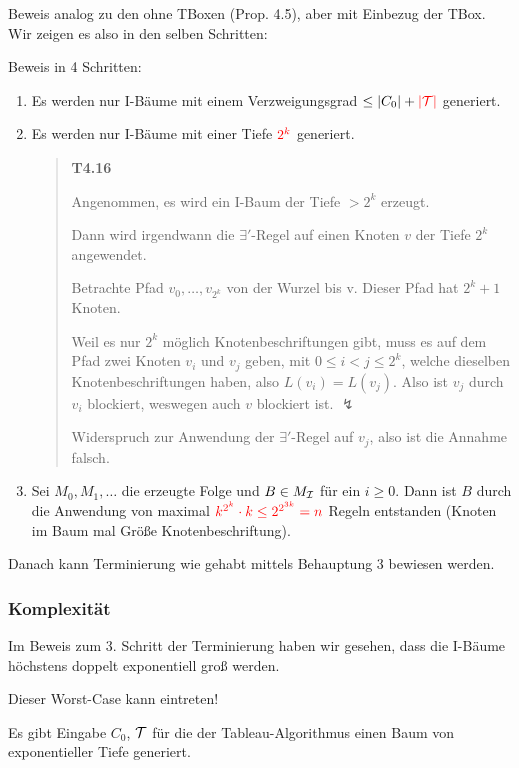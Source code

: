 Beweis analog zu den ohne TBoxen (Prop. 4.5), aber mit Einbezug der TBox. Wir zeigen es also in den selben Schritten:

Beweis in 4 Schritten:

\begin{enumerate}
\def\labelenumi{\arabic{enumi}.}
\item
  Es werden nur I-Bäume mit einem Verzweigungsgrad $\leq \left| C_{0} \right| + \color{red} \left| \MT \right|$ generiert.
\item
  Es werden nur I-Bäume mit einer Tiefe $\color{red} 2^k$ generiert.
  \begin{quote}
  \textbf{T4.16}

  Angenommen, es wird ein I-Baum der Tiefe $> 2^k$ erzeugt.

  Dann wird irgendwann die $\exists '$-Regel auf einen Knoten $v$ der Tiefe $2^k$ angewendet.

  Betrachte Pfad $v_0, \ldots , v_{2^k}$ von der Wurzel bis v. Dieser Pfad hat $2^k+1$ Knoten.

  Weil es nur $2^k$ möglich Knotenbeschriftungen gibt, muss es auf dem Pfad zwei Knoten $v_i$ und $v_j$ geben, mit $0 \leq i < j \leq 2^k$, welche dieselben Knotenbeschriftungen haben, also $L(v_i) = L(v_j)$. Also ist $v_j$ durch $v_i$ blockiert, weswegen auch $v$ blockiert ist. $\lightning$

  Widerspruch zur Anwendung der $\exists '$-Regel auf $v_j$, also ist die Annahme falsch.
  \end{quote}
\item
  Sei $M_{0},M_1,\ldots$ die erzeugte Folge und $B \in M_{\mathcal{I}}$ für
  ein $i \geq 0$. Dann ist $B$ durch die Anwendung von maximal
  $\color{red} k^{2^{k}} \cdot k \leq 2^{2^{3k}}= n$ Regeln entstanden (Knoten im Baum mal Größe Knotenbeschriftung).
\end{enumerate}

Danach kann Terminierung wie gehabt mittels Behauptung 3 bewiesen werden.

\subsubsection{Komplexität}

Im Beweis zum 3. Schritt der Terminierung haben wir gesehen, dass die I-Bäume höchstens doppelt exponentiell groß werden.

Dieser Worst-Case kann eintreten!

\begin{lemma}
Es gibt Eingabe $C_0$, $\mathcal{T}$ für die der Tableau-Algorithmus einen Baum von exponentieller Tiefe generiert.
\end{lemma}

